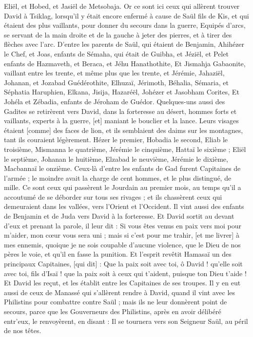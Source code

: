 \begin{multicols}{2}
Eliël, et Hobed, et Jasiël de Metsobaja.
\VerseOne{}Or ce sont ici ceux qui allèrent trouver David à Tsiklag, lorsqu'il y était encore enfermé à cause de Saül fils de Kis, et qui étaient des plus vaillants, pour donner du secours dans la guerre,
Equipés d'arcs, se servant de la main droite et de la gauche à jeter des pierres, et à tirer des flèches avec l'arc. D'entre les parents de Saül, qui étaient de Benjamin,
Ahihézer le Chef, et Joas, enfants de Sémaha, qui était de Guibha, et Jéziël, et Pelet enfants de Hazmaveth, et Beraca, et Jéhu Hanathothite,
Et Jismahja Gabaonite, vaillant entre les trente, et même plus que les trente, et Jérémie, Jahaziël, Johanan, et Jozabad Guédérothite,
Elhuzaï, Jérimoth, Béhalia, Sémaria, et Séphatia Haruphien,
Elkana, Jisija, Hazaréël, Johézer et Jasobham Corites,
Et Johéla et Zébadia, enfants de Jéroham de Guédor.
Quelques-uns aussi des Gadites se retirèrent vers David, dans la forteresse au désert, hommes forts et vaillants, experts à la guerre, [et] maniant le bouclier et la lance. Leurs visages étaient [comme] des faces de lion, et ils semblaient des daims sur les montagnes, tant ils couraient légèrement.
Hézer le premier, Hobadia le second, Eliab le troisième,
Mismanna le quatrième, Jérémie le cinquième,
Hattaï le sixième ; Eliël le septième,
Johanan le huitième, Elzabad le neuvième,
Jérémie le dixième, Macbannaï le onzième.
Ceux-là d'entre les enfants de Gad furent Capitaines de l'armée ; le moindre avait la charge de cent hommes, et le plus distingué, de mille.
Ce sont ceux qui passèrent le Jourdain au premier mois, au temps qu'il a accoutumé de se déborder sur tous ses rivages ; et ils chassèrent ceux qui demeuraient dans les vallées, vers l'Orient et l'Occident.
Il vint aussi des enfants de Benjamin et de Juda vers David à la forteresse.
Et David sortit au devant d'eux et prenant la parole, il leur dit : Si vous êtes venus en paix vers moi pour m'aider, mon cœur vous sera uni ; mais si c'est pour me trahir, [et me livrer] à mes ennemis, quoique je ne sois coupable d'aucune violence, que le Dieu de nos pères le voie, et qu'il en fasse la punition.
Et l'esprit revêtit Hamasaï un des principaux Capitaines, [qui dit] : Que la paix soit avec toi, ô David ! qu'elle soit avec toi, fils d'Isaï ! que la paix soit à ceux qui t'aident, puisque ton Dieu t'aide ! Et David les reçut, et les établit entre les Capitaines de ses troupes.
Il y en eut aussi de ceux de Manassé qui s'allèrent rendre à David, quand il vint avec les Philistins pour combattre contre Saül ; mais ils ne leur donnèrent point de secours, parce que les Gouverneurs des Philistins, après en avoir délibéré entr'eux, le renvoyèrent, en disant : Il se tournera vers son Seigneur Saül, au péril de nos têtes.

\end{multicols}
